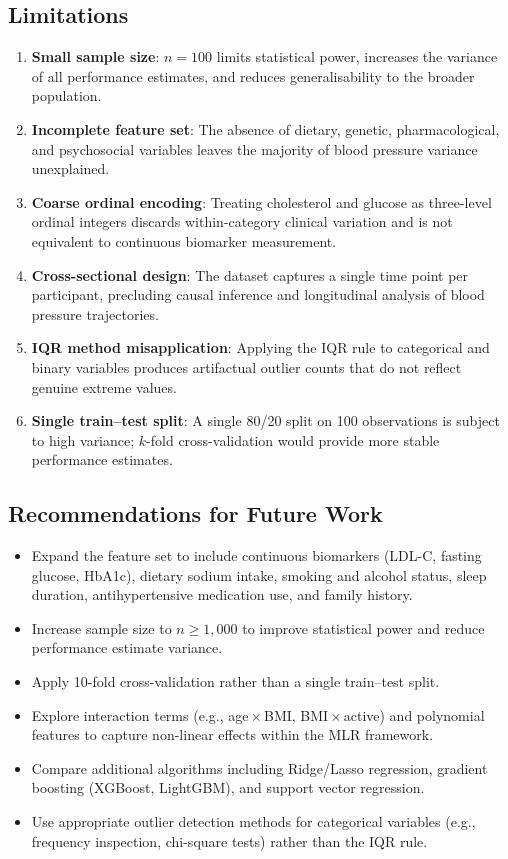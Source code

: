 ﻿\documentclass[conference]{IEEEtran}
\begin{document}
\subsection{Limitations}

\begin{enumerate}
  \item \textbf{Small sample size}: $n=100$ limits statistical power, increases the variance of all performance estimates, and reduces generalisability to the broader population.
  \item \textbf{Incomplete feature set}: The absence of dietary, genetic, pharmacological, and psychosocial variables leaves the majority of blood pressure variance unexplained.
  \item \textbf{Coarse ordinal encoding}: Treating cholesterol and glucose as three-level ordinal integers discards within-category clinical variation and is not equivalent to continuous biomarker measurement.
  \item \textbf{Cross-sectional design}: The dataset captures a single time point per participant, precluding causal inference and longitudinal analysis of blood pressure trajectories.
  \item \textbf{IQR method misapplication}: Applying the IQR rule to categorical and binary variables produces artifactual outlier counts that do not reflect genuine extreme values.
  \item \textbf{Single train--test split}: A single 80/20 split on 100 observations is subject to high variance; $k$-fold cross-validation would provide more stable performance estimates.
\end{enumerate}

\subsection{Recommendations for Future Work}

\begin{itemize}
  \item Expand the feature set to include continuous biomarkers (LDL-C, fasting glucose, HbA1c), dietary sodium intake, smoking and alcohol status, sleep duration, antihypertensive medication use, and family history.
  \item Increase sample size to $n \geq 1{,}000$ to improve statistical power and reduce performance estimate variance.
  \item Apply 10-fold cross-validation rather than a single train--test split.
  \item Explore interaction terms (e.g., age\,$\times$\,BMI, BMI\,$\times$\,active) and polynomial features to capture non-linear effects within the MLR framework.
  \item Compare additional algorithms including Ridge/Lasso regression, gradient boosting (XGBoost, LightGBM), and support vector regression.
  \item Use appropriate outlier detection methods for categorical variables (e.g., frequency inspection, chi-square tests) rather than the IQR rule.
\end{itemize}
\end{document}
